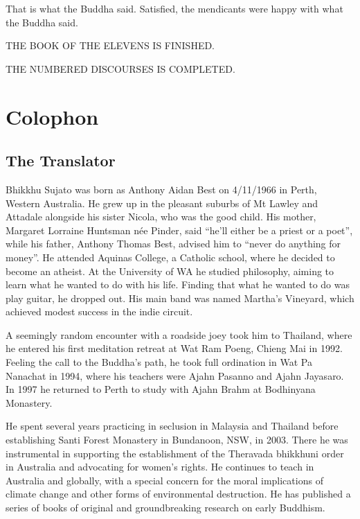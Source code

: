 \documentclass[12pt,openany]{book}%
\newcommand*{\scendbook}[1]{\begin{center}\uppercase{#1}\end{center}}
\let\oldbackmatter\backmatter
\renewcommand{\backmatter}{%
\chapterfont{\setstretch{.85}\normalfont\centering}%
\sectionfont{\setstretch{.85}\Semiboldsubheadfont}%
\oldbackmatter}
\begin{document}
That is what the Buddha said. Satisfied, the mendicants were happy with what the Buddha said. 

\scendbook{The Book of the Elevens is finished. }

\scendbook{The Numbered Discourses is completed. }

%
\backmatter%
\chapter*{Colophon}

\section*{The Translator}

Bhikkhu Sujato was born as Anthony Aidan Best on 4/11/1966 in Perth, Western Australia. He grew up in the pleasant suburbs of Mt Lawley and Attadale alongside his sister Nicola, who was the good child. His mother, Margaret Lorraine Huntsman née Pinder, said “he’ll either be a priest or a poet”, while his father, Anthony Thomas Best, advised him to “never do anything for money”. He attended Aquinas College, a Catholic school, where he decided to become an atheist. At the University of WA he studied philosophy, aiming to learn what he wanted to do with his life. Finding that what he wanted to do was play guitar, he dropped out. His main band was named Martha’s Vineyard, which achieved modest success in the indie circuit. 

A seemingly random encounter with a roadside joey took him to Thailand, where he entered his first meditation retreat at Wat Ram Poeng, Chieng Mai in 1992. Feeling the call to the Buddha’s path, he took full ordination in Wat Pa Nanachat in 1994, where his teachers were Ajahn Pasanno and Ajahn Jayasaro. In 1997 he returned to Perth to study with Ajahn Brahm at Bodhinyana Monastery. 

He spent several years practicing in seclusion in Malaysia and Thailand before establishing Santi Forest Monastery in Bundanoon, NSW, in 2003. There he was instrumental in supporting the establishment of the Theravada bhikkhuni order in Australia and advocating for women’s rights. He continues to teach in Australia and globally, with a special concern for the moral implications of climate change and other forms of environmental destruction. He has published a series of books of original and groundbreaking research on early Buddhism. 
\end{document}
